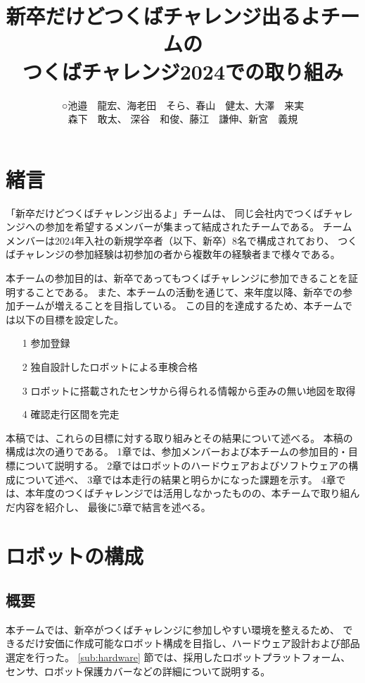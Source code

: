 \documentclass[twocolumn,9pt]{jsproceedings}
\title{新卒だけどつくばチャレンジ出るよチームの\\つくばチャレンジ2024での取り組み}
\author{○池邉　龍宏\authorrefmark{1}、海老田　そら\authorrefmark{1}、春山　健太\authorrefmark{1}、大澤　来実\authorrefmark{1}\\森下　敢太\authorrefmark{1}、
深谷　和俊\authorrefmark{1}、藤江　謙伸\authorrefmark{1}、新宮　義規\authorrefmark{1}}
\affiliation{新卒だけどつくばチャレンジ出るよ}
\begin{document}
\maketitle


\section{緒言}\label{sec:1}

「新卒だけどつくばチャレンジ出るよ」チームは、
同じ会社内でつくばチャレンジへの参加を希望するメンバーが集まって結成されたチームである。
チームメンバーは2024年入社の新規学卒者（以下、新卒）8名で構成されており、
つくばチャレンジの参加経験は初参加の者から複数年の経験者まで様々である。

本チームの参加目的は、新卒であってもつくばチャレンジに参加できることを証明することである。
また、本チームの活動を通じて、来年度以降、新卒での参加チームが増えることを目指している。
この目的を達成するため、本チームでは以下の目標を設定した。
\begin{itemize}
  \item[1] 参加登録
  \item[2] 独自設計したロボットによる車検合格
  \item[3] ロボットに搭載されたセンサから得られる情報から歪みの無い地図を取得
  \item[4] 確認走行区間を完走
\end{itemize}


本稿では、これらの目標に対する取り組みとその結果について述べる。
本稿の構成は次の通りである。
1章では、参加メンバーおよび本チームの参加目的・目標について説明する。
2章ではロボットのハードウェアおよびソフトウェアの構成について述べ、
3章では本走行の結果と明らかになった課題を示す。
4章では、本年度のつくばチャレンジでは活用しなかったものの、本チームで取り組んだ内容を紹介し、
最後に5章で結言を述べる。

\section{ロボットの構成}

\subsection{概要}
本チームでは、新卒がつくばチャレンジに参加しやすい環境を整えるため、
できるだけ安価に作成可能なロボット構成を目指し、ハードウェア設計および部品選定を行った。
\ref{sub:hardware} 節では、採用したロボットプラットフォーム、センサ、ロボット保護カバーなどの詳細について説明する。
\end{document}
